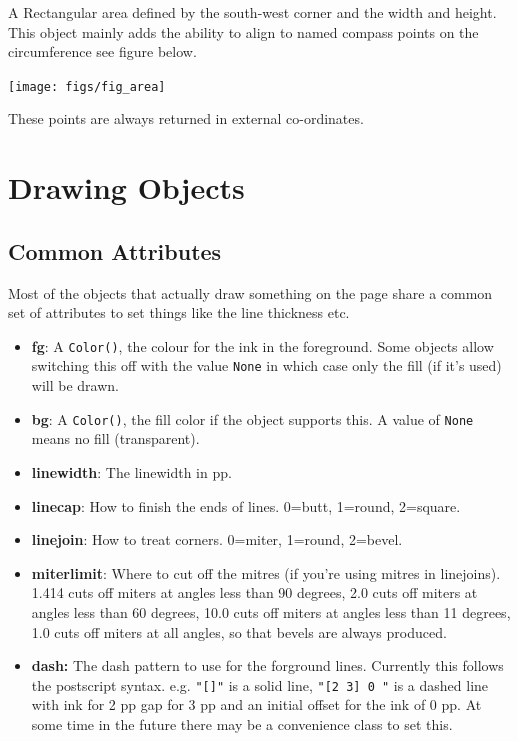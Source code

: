 \documentclass[a4paper]{book}
\begin{document}
A Rectangular area defined by the south-west corner and the width and height.
This object mainly adds the ability to align to named compass points on the 
circumference see figure below.

\begin{center}
  \texttt{[image: figs/fig\_area]}
\end{center}

These points are always returned in external co-ordinates.

\section{Drawing Objects}

\subsection{Common Attributes}
\label{sec:draw-attr}

Most of the objects that actually draw something on the page
share a common set of attributes to set things like the line thickness
etc. 

\begin{itemize}
\item \textbf{fg}: A \Verb|Color()|, the colour for the ink in the
  foreground.  Some objects allow switching this off with the value
  \Verb|None| in which case only the fill (if it's used) will be
  drawn.
\item \textbf{bg}: A \Verb|Color()|, the fill color if the object
  supports this. A value of \Verb|None| means no fill (transparent).
\item \textbf{linewidth}: The linewidth in pp.
\item \textbf{linecap}: How to finish the ends of lines. 0=butt,
  1=round, 2=square.
\item \textbf{linejoin}: How to treat corners. 0=miter, 1=round,
  2=bevel.
\item \textbf{miterlimit}: Where to cut off the mitres (if you're
  using mitres in linejoins). 1.414 cuts off miters at angles less
  than 90 degrees, 2.0 cuts off miters at angles less than 60 degrees,
  10.0 cuts off miters at angles less than 11 degrees, 1.0 cuts off
  miters at all angles, so that bevels are always produced.
\item \textbf{dash:} The dash pattern to use for the forground lines.
  Currently this follows the postscript syntax. e.g. \Verb|"[]"| is a
  solid line, \Verb|"[2 3] 0 "| is a dashed line with ink for 2 pp gap
  for 3 pp and an initial offset for the ink of 0 pp. At some time in
  the future there may be a convenience class to set this.
\end{itemize}
\end{document}
